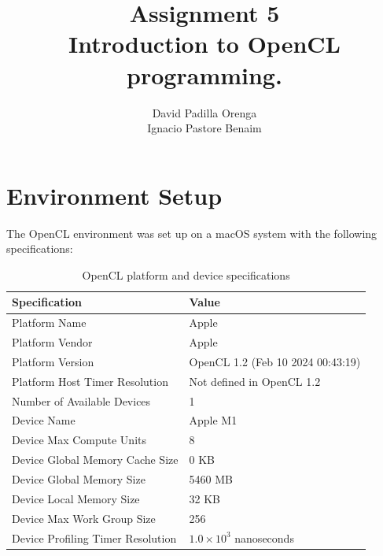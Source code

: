 \documentclass{article}
\title{Assignment 5 \\ \small Introduction to OpenCL programming.}
\author{David Padilla Orenga\\ Ignacio Pastore Benaim}
\date{}
\begin{document}
\maketitle

\section*{Environment Setup}

The OpenCL environment was set up on a macOS system with the following specifications:

\begin{table}[h!]
\centering
\renewcommand{\arraystretch}{1.5} %
\begin{tabular}{|l|l|}
\hline
\textbf{Specification}                           & \textbf{Value}                         \\ \hline
Platform Name                                   & Apple                                  \\ \hline
Platform Vendor                                 & Apple                                  \\ \hline
Platform Version                                & OpenCL 1.2 (Feb 10 2024 00:43:19)     \\ \hline
Platform Host Timer Resolution                  & Not defined in OpenCL 1.2    \\ \hline
Number of Available Devices                     & 1                                      \\ \hline
Device Name                                     & Apple M1                               \\ \hline
Device Max Compute Units                        & 8                                      \\ \hline
Device Global Memory Cache Size                & 0 KB                                   \\ \hline
Device Global Memory Size                       & 5460 MB                                \\ \hline
Device Local Memory Size                        & 32 KB                                  \\ \hline
Device Max Work Group Size                      & 256                                    \\ \hline
Device Profiling Timer Resolution               & $1.0 \times 10^{3}$ nanoseconds        \\ \hline
\end{tabular}
\caption{OpenCL platform and device specifications}
\label{tab:platform_specs}
\end{table}
\end{document}
